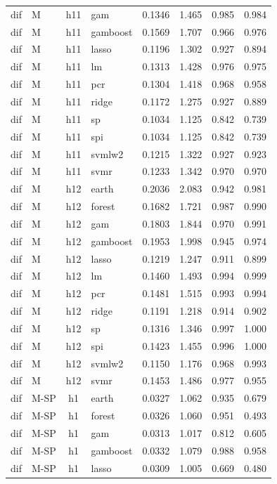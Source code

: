 \begin{ThreePartTable}
\begin{longtable}[t]{llclcccc}
dif & M & h11 & gam & 0.1346 & 1.465 & 0.985 & 0.984\\
dif & M & h11 & gamboost & 0.1569 & 1.707 & 0.966 & 0.976\\
dif & M & h11 & lasso & 0.1196 & 1.302 & 0.927 & 0.894\\
dif & M & h11 & lm & 0.1313 & 1.428 & 0.976 & 0.975\\
dif & M & h11 & pcr & 0.1304 & 1.418 & 0.968 & 0.958\\
dif & M & h11 & ridge & 0.1172 & 1.275 & 0.927 & 0.889\\
dif & M & h11 & sp & 0.1034 & 1.125 & 0.842 & 0.739\\
dif & M & h11 & spi & 0.1034 & 1.125 & 0.842 & 0.739\\
dif & M & h11 & svmlw2 & 0.1215 & 1.322 & 0.927 & 0.923\\
dif & M & h11 & svmr & 0.1233 & 1.342 & 0.970 & 0.970\\
\addlinespace
dif & M & h12 & earth & 0.2036 & 2.083 & 0.942 & 0.981\\
dif & M & h12 & forest & 0.1682 & 1.721 & 0.987 & 0.990\\
dif & M & h12 & gam & 0.1803 & 1.844 & 0.970 & 0.991\\
dif & M & h12 & gamboost & 0.1953 & 1.998 & 0.945 & 0.974\\
dif & M & h12 & lasso & 0.1219 & 1.247 & 0.911 & 0.899\\
dif & M & h12 & lm & 0.1460 & 1.493 & 0.994 & 0.999\\
dif & M & h12 & pcr & 0.1481 & 1.515 & 0.993 & 0.994\\
dif & M & h12 & ridge & 0.1191 & 1.218 & 0.914 & 0.902\\
dif & M & h12 & sp & 0.1316 & 1.346 & 0.997 & 1.000\\
dif & M & h12 & spi & 0.1423 & 1.455 & 0.996 & 1.000\\
dif & M & h12 & svmlw2 & 0.1150 & 1.176 & 0.968 & 0.993\\
dif & M & h12 & svmr & 0.1453 & 1.486 & 0.977 & 0.955\\
\addlinespace
dif & M-SP & h1 & earth & 0.0327 & 1.062 & 0.935 & 0.679\\
dif & M-SP & h1 & forest & 0.0326 & 1.060 & 0.951 & 0.493\\
dif & M-SP & h1 & gam & 0.0313 & 1.017 & 0.812 & 0.605\\
dif & M-SP & h1 & gamboost & 0.0332 & 1.079 & 0.988 & 0.958\\
dif & M-SP & h1 & lasso & 0.0309 & 1.005 & 0.669 & 0.480\\

\end{longtable}
\end{ThreePartTable}
